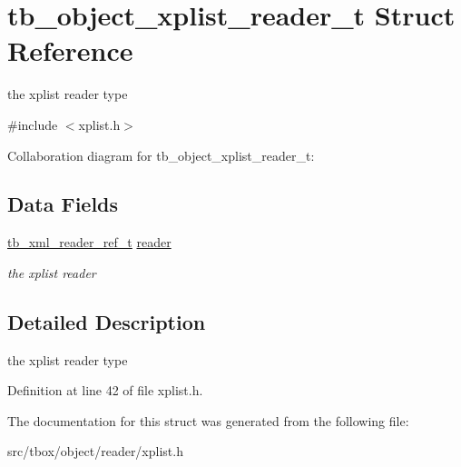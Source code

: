 \hypertarget{structtb__object__xplist__reader__t}{\section{tb\-\_\-object\-\_\-xplist\-\_\-reader\-\_\-t Struct Reference}
\label{structtb__object__xplist__reader__t}
}


the xplist reader type  




{\ttfamily \#include $<$xplist.\-h$>$}



Collaboration diagram for tb\-\_\-object\-\_\-xplist\-\_\-reader\-\_\-t\-:
\subsection*{Data Fields}
\begin{DoxyCompactItemize}
\item 
\hypertarget{structtb__object__xplist__reader__t_aefb2ae0fbf20b06aadfd23ce0aa89981}{\hyperlink{structtb__xml__reader__ref__t}{tb\-\_\-xml\-\_\-reader\-\_\-ref\-\_\-t} \hyperlink{structtb__object__xplist__reader__t_aefb2ae0fbf20b06aadfd23ce0aa89981}{reader}}\label{structtb__object__xplist__reader__t_aefb2ae0fbf20b06aadfd23ce0aa89981}

\begin{DoxyCompactList}\small\item\em the xplist reader \end{DoxyCompactList}\end{DoxyCompactItemize}


\subsection{Detailed Description}
the xplist reader type 

Definition at line 42 of file xplist.\-h.



The documentation for this struct was generated from the following file\-:\begin{DoxyCompactItemize}
\item 
src/tbox/object/reader/xplist.\-h\end{DoxyCompactItemize}

